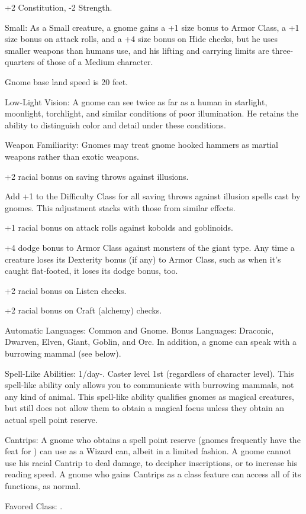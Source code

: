 \begin{list}{}{\leftmargin=1em}
 \item +2 Constitution, -2 Strength.
 \item Small: As a Small creature, a gnome gains a +1 size bonus to Armor Class, a +1 size bonus on attack rolls, and a +4 size bonus on Hide checks, but he uses smaller weapons than humans use, and his lifting and carrying limits are three-quarters of those of a Medium character.
 \item Gnome base land speed is 20 feet.
 \item Low-Light Vision: A gnome can see twice as far as a human in starlight, moonlight, torchlight, and similar conditions of poor illumination. He retains the ability to distinguish color and detail under these conditions.
 \item Weapon Familiarity: Gnomes may treat gnome hooked hammers as martial weapons rather than exotic weapons.
 \item +2 racial bonus on saving throws against illusions.
 \item Add +1 to the Difficulty Class for all saving throws against illusion spells cast by gnomes. This adjustment stacks with those from similar effects.
 \item +1 racial bonus on attack rolls against kobolds and goblinoids.
 \item +4 dodge bonus to Armor Class against monsters of the giant type. Any time a creature loses its Dexterity bonus (if any) to Armor Class, such as when it's caught flat-footed, it loses its dodge bonus, too.
 \item +2 racial bonus on Listen checks.
 \item +2 racial bonus on Craft (alchemy) checks.
 \item Automatic Languages: Common and Gnome. Bonus Languages: Draconic, Dwarven, Elven, Giant, Goblin, and Orc. In addition, a gnome can speak with a burrowing mammal (see below).
 \item Spell-Like Abilities: 1/day-. Caster level 1st (regardless of character level). This spell-like ability only allows you to communicate with burrowing mammals, not any kind of animal. This spell-like ability qualifies gnomes as magical creatures, but still does not allow them to obtain a magical focus unless they obtain an actual spell point reserve.
 \item Cantrips: A gnome who obtains a spell point reserve (gnomes frequently have the  feat for ) can use  as a Wizard can, albeit in a limited fashion. A gnome cannot use his racial Cantrip to deal damage, to decipher inscriptions, or to increase his reading speed. A gnome who gains Cantrips as a class feature can access all of its functions, as normal.
 \item Favored Class: .
\end{list}
